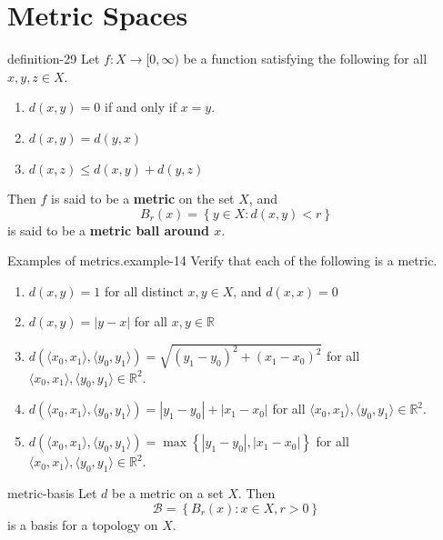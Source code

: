 \documentclass[10pt,]{article}
\newcommand{\terminology}[1]{\textbf{#1}}
\newcommand{\tuple}[1]{\langle #1 \rangle}
\newcommand{\mb}{\mathbb}
\newcommand{\mc}{\mathcal}
\newcommand{\setBuilder}[2]{\left\{#1:#2\right\}}
\newcommand{\setList}[1]{\left\{#1\right\}}
\newcommand{\lt}{<}
\begin{document}
\section[{Metric Spaces}]{Metric Spaces}\label{section-metric}
\begin{definition}{}{definition-29}%
\hypertarget{p-103}{}%
Let \(f:X\to[0,\infty)\) be a function satisfying the following for all \(x,y,z\in X\).%
\leavevmode%
\begin{enumerate}
\item\hypertarget{li-93}{}\(d(x,y)=0\) if and only if \(x=y\).%
\item\hypertarget{li-94}{}\(d(x,y)=d(y,x)\)%
\item\hypertarget{li-95}{}\(d(x,z)\leq d(x,y)+d(y,z)\)%
\end{enumerate}
\hypertarget{p-104}{}%
Then \(f\) is said to be a \terminology{metric} on the set \(X\), and%
\begin{equation*}
B_r(x)=\setBuilder{y\in X}{d(x,y)\lt r}
\end{equation*}
is said to be a \terminology{metric ball around \(x\)}.%
\end{definition}
\begin{example}{Examples of metrics.}{example-14}%
\hypertarget{p-105}{}%
Verify that each of the following is a metric.%
\leavevmode%
\begin{enumerate}
\item\hypertarget{li-96}{}\(d(x,y)=1\) for all distinct \(x,y\in X\), and \(d(x,x)=0\)%
\item\hypertarget{li-97}{}\(d(x,y)=|y-x|\) for all \(x,y\in\mb R\)%
\item\hypertarget{li-98}{}\(d(\tuple{x_0,x_1},\tuple{y_0,y_1})=\sqrt{(y_1-y_0)^2+(x_1-x_0)^2}\) for all \(\tuple{x_0,x_1},\tuple{y_0,y_1}\in\mb R^2\).%
\item\hypertarget{li-99}{}\(d(\tuple{x_0,x_1},\tuple{y_0,y_1})=|y_1-y_0|+|x_1-x_0|\) for all \(\tuple{x_0,x_1},\tuple{y_0,y_1}\in\mb R^2\).%
\item\hypertarget{li-100}{}\(d(\tuple{x_0,x_1},\tuple{y_0,y_1})=\max\setList{|y_1-y_0|,|x_1-x_0|}\) for all \(\tuple{x_0,x_1},\tuple{y_0,y_1}\in\mb R^2\).%
\end{enumerate}
\end{example}
\begin{theorem}{}{}{metric-basis}%
\hypertarget{p-106}{}%
Let \(d\) be a metric on a set \(X\). Then%
\begin{equation*}
\mc B=\setBuilder{B_r(x)}{x\in X,r>0}
\end{equation*}
is a basis for a topology on \(X\).%
\end{theorem}
\end{document}
